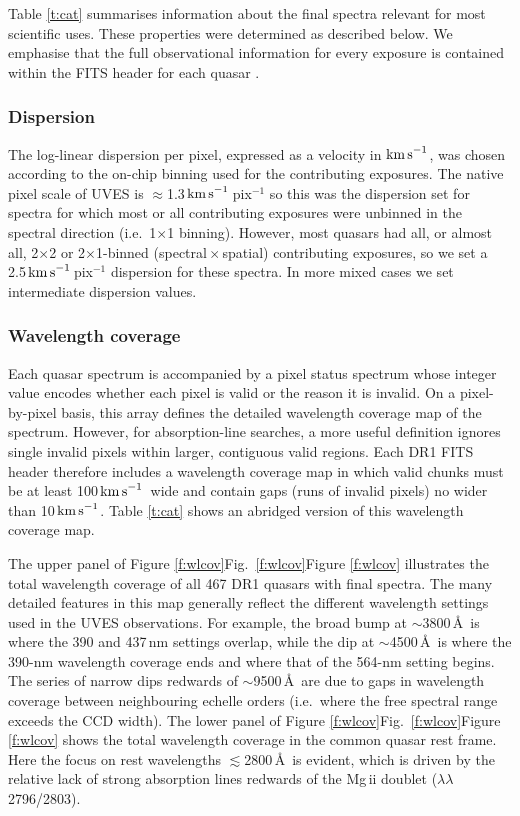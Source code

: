 \documentclass[fleqn,usenatbib,usedcolumn]{mnras}
\renewcommand{\la}{\lesssim} %
\newcommand{\Tref}[1]{Table \ref{#1}}
\newcommand{\Fref}[1]{\ifhmode \ifnum\spacefactor=1001 Figure \ref{#1}\else Fig.\ \ref{#1}\fi \else Figure \ref{#1}\fi}
\newcommand{\kms}{\ensuremath{\textrm{km\,s}^{-1}}}
\begin{document}
\Tref{t:cat} summarises information about the final spectra relevant for most scientific uses. These properties were determined as described below. We emphasise that the full observational information for every exposure is contained within the FITS header for each quasar \citep[see documentation in][]{Murphy:2018:UVESSQUADDR1}.

\subsubsection{Dispersion}\label{sss:dispersion}

The log-linear dispersion per pixel, expressed as a velocity in \kms, was chosen according to the on-chip binning used for the contributing exposures. The native pixel scale of UVES is $\approx$1.3\,\kms\,pix$^{-1}$ so this was the dispersion set for spectra for which most or all contributing exposures were unbinned in the spectral direction (i.e.\ 1$\times$1 binning). However, most quasars had all, or almost all, 2$\times$2 or 2$\times$1-binned (spectral\,$\times$\,spatial) contributing exposures, so we set a 2.5\,\kms\,pix$^{-1}$ dispersion for these spectra. In more mixed cases we set intermediate dispersion values.

\subsubsection{Wavelength coverage}\label{sss:coverage}

Each quasar spectrum is accompanied by a pixel status spectrum whose integer value encodes whether each pixel is valid or the reason it is invalid. On a pixel-by-pixel basis, this array defines the detailed wavelength coverage map of the spectrum. However, for absorption-line searches, a more useful definition ignores single invalid pixels within larger, contiguous valid regions. Each DR1 FITS header therefore includes a wavelength coverage map in which valid chunks must be at least 100\,\kms\ wide and contain gaps (runs of invalid pixels) no wider than 10\,\kms. \Tref{t:cat} shows an abridged version of this wavelength coverage map.

The upper panel of \Fref{f:wlcov} illustrates the total wavelength coverage of all 467 DR1 quasars with final spectra. The many detailed features in this map generally reflect the different wavelength settings used in the UVES observations. For example, the broad bump at $\sim$3800\,\AA\ is where the 390 and 437\,nm settings overlap, while the dip at $\sim$4500\,\AA\ is where the 390-nm wavelength coverage ends and where that of the 564-nm setting begins. The series of narrow dips redwards of $\sim$9500\,\AA\ are due to gaps in wavelength coverage between neighbouring echelle orders (i.e.\ where the free spectral range exceeds the CCD width). The lower panel of \Fref{f:wlcov} shows the total wavelength coverage in the common quasar rest frame. Here the focus on rest wavelengths $\la$2800\,\AA\ is evident, which is driven by the relative lack of strong absorption lines redwards of the Mg{\sc \,ii} doublet ($\lambda\lambda$2796/2803).
\end{document}
